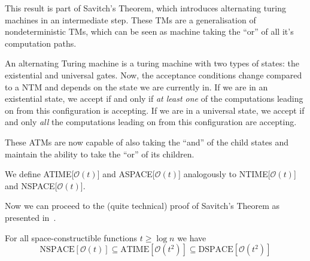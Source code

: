 This result is part of Savitch's Theorem, which introduces alternating turing machines in an intermediate step.
These TMs are a generalisation of nondeterministic TMs, which can be seen as machine taking the ``or'' of all it's computation paths.

\begin{define}
    An alternating Turing machine is a turing machine with two types of states: the existential and universal gates.
    Now, the acceptance conditions change compared to a NTM and depends on the state we are currently in.
    If we are in an existential state, we accept if and only if \emph{at least one} of the computations leading on from this configuration is accepting.
    If we are in a universal state, we accept if and only \emph{all} the computations leading on from this configuration are accepting.
\end{define}

These ATMs are now capable of also taking the ``and'' of the child states and maintain the ability to take the ``or'' of its children.

We define ATIME[$\mathcal{O}(t)$] and ASPACE[$\mathcal{O}(t)$] analogously to NTIME[$\mathcal{O}(t)$] and NSPACE[$\mathcal{O}(t)$].

Now we can proceed to the (quite technical) proof of Savitch's Theorem as presented in~\cite{descriptive-complexity}.

\begin{theorem}
    For all space-constructible functions $t \geq \log n$ we have
    \[
        \text{NSPACE}[\mathcal{O}(t)] \subseteq \text{ATIME}[\mathcal{O}(t^2)] \subseteq \text{DSPACE}[\mathcal{O}(t^2)]
    \]
\end{theorem}

